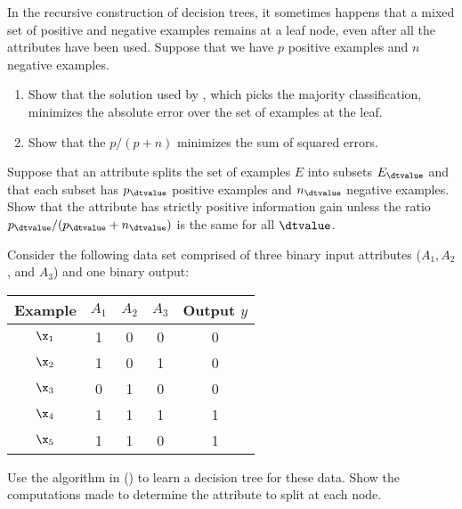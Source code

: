 \begin{exercise}%
In the recursive construction of decision trees, it sometimes happens that a
mixed set of positive and negative examples remains at a leaf node, even after
all the attributes have been used. Suppose that we have \(p\) positive examples
and \(n\) negative examples.
\begin{enumerate}
\item
Show that the solution used by , which picks the
majority classification, minimizes the absolute error over the set of examples
at the leaf.
\item Show that the  \(p/(p+n)\)
minimizes the sum of squared errors.
\end{enumerate}
\end{exercise} 

\begin{exercise}%
Suppose that an attribute splits the set of examples \(E\) into subsets
\(E_{\dtvalue}\) and that each subset has \(p_{\dtvalue}\) positive examples and \(n_{\dtvalue}\)
negative examples. Show that the attribute has strictly positive information
gain unless the ratio \(p_{\dtvalue}/(p_{\dtvalue}+n_{\dtvalue})\) is the same for all \({\dtvalue}\).
\end{exercise} 

\begin{exercise}
Consider the following data set comprised of three binary input
attributes (\(A_1, A_2\), and \(A_3\)) and one binary output:

\medskip
\begin{tabular}{|c|c|c|c|c|}
\hline
{\bf Example} & \(A_1\) & \(A_2\) & \(A_3\) & Output \(y\) \\
\hline
\(\x_1\) & 1 & 0 & 0 & 0 \\
\(\x_2\) & 1 & 0 & 1 & 0 \\
\(\x_3\) & 0 & 1 & 0 & 0 \\
\(\x_4\) & 1 & 1 & 1 & 1 \\
\(\x_5\) & 1 & 1 & 0 & 1 \\
\hline
\end{tabular}

\medskip\noindent Use the algorithm in 
() to learn a decision tree for these data.  Show
the computations made to determine the attribute to split at each
node.
\end{exercise} 

